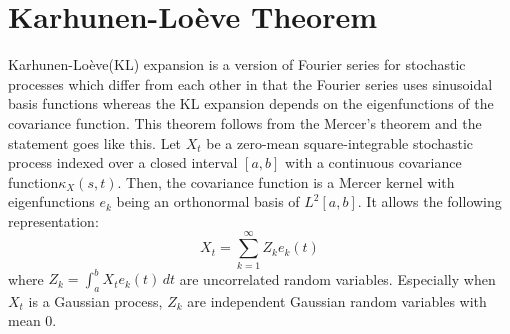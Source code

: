 \documentclass[11pt]{article}
\begin{document}
\section{Karhunen-Loève Theorem}
Karhunen-Loève(KL) expansion is a version of Fourier series for stochastic processes which differ from each other in that the Fourier series uses sinusoidal basis functions whereas the KL expansion depends on the eigenfunctions of the covariance function. This theorem follows from the Mercer's theorem and the statement goes like this. Let $X_{t}$ be a zero-mean square-integrable stochastic process indexed over a closed interval $[a,b]$ with a continuous covariance function$\kappa_{X}\left(s,t \right).$ Then, the covariance function is a Mercer kernel with eigenfunctions $e_{k}$ being an orthonormal basis of $L^{2}[a,b]$. It allows the following representation:
$$
  X_{t} = \sum_{k=1}^{\infty} Z_{k}e_{k}\left(t\right)
$$
where $Z_{k} = \int_{a}^{b}X_{t}e_{k}\left(t\right)\, dt$ are uncorrelated random variables. Especially when $X_{t}$ is a Gaussian process, $Z_{k}$ are independent Gaussian random variables with mean $0$.
\end{document}
